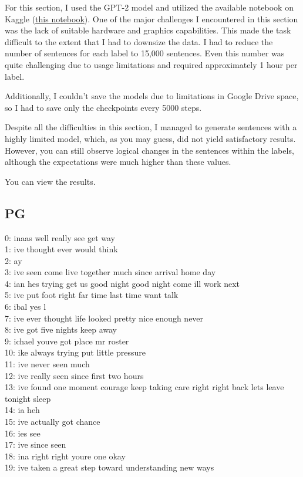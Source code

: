 \documentclass[a4paper]{article}
\begin{document}
For this section, I used the GPT-2 model and utilized the available notebook on Kaggle (\href{https://www.kaggle.com/code/nulldata/fine-tuning-gpt-2-to-generate-netlfix-descriptions}{this notebook}). One of the major challenges I encountered in this section was the lack of suitable hardware and graphics capabilities. This made the task difficult to the extent that I had to downsize the data. I had to reduce the number of sentences for each label to 15,000 sentences. Even this number was quite challenging due to usage limitations and required approximately 1 hour per label.

Additionally, I couldn't save the models due to limitations in Google Drive space, so I had to save only the checkpoints every 5000 steps.

Despite all the difficulties in this section, I managed to generate sentences with a highly limited model, which, as you may guess, did not yield satisfactory results. However, you can still observe logical changes in the sentences within the labels, although the expectations were much higher than these values.

You can view the results.

\subsection*{PG}

\begin{center}
    0:  inaas well really see get way\\
1:  ive thought ever would think\\
2:   ay\\
3:  ive seen come live together much since arrival home day\\
4:  ian hes trying get us good night good night come ill work next\\
5:  ive put foot right far time last time want talk\\
6:  ibal yes l\\
7:  ive ever thought life looked pretty nice enough never\\
8:  ive got five nights keep away\\
9:  ichael youve got place mr roster\\
10:  ike always trying put little pressure\\
11:  ive never seen much\\
12:  ive really seen since first two hours\\
13:  ive found one moment courage keep taking care right right back lets leave tonight sleep\\
14:  ia heh\\
15:  ive actually got chance\\
16:  ies see\\
17:  ive since seen\\
18:  ina right right youre one okay\\
19:  ive taken a great step toward understanding new ways\\
\end{center}
\end{document}

